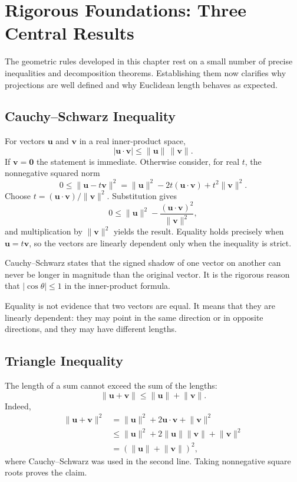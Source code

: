 \section{Rigorous Foundations: Three Central Results}
\label{sec:rigorous-vector-foundations}

The geometric rules developed in this chapter rest on a small number of precise
inequalities and decomposition theorems. Establishing them now clarifies why
projections are well defined and why Euclidean length behaves as expected.

\subsection{Cauchy--Schwarz Inequality}
For vectors $\mathbf u$ and $\mathbf v$ in a real inner-product space,
\[
\boxed{|\mathbf u\cdot\mathbf v|\leq \lVert\mathbf u\rVert\,\lVert\mathbf v\rVert.}
\]
If $\mathbf v=\mathbf0$ the statement is immediate. Otherwise consider, for
real $t$, the nonnegative squared norm
\[
0\leq\lVert\mathbf u-t\mathbf v\rVert^2
=\lVert\mathbf u\rVert^2-2t(\mathbf u\cdot\mathbf v)
+t^2\lVert\mathbf v\rVert^2.
\]
Choose $t=(\mathbf u\cdot\mathbf v)/\lVert\mathbf v\rVert^2$. Substitution gives
\[
0\leq \lVert\mathbf u\rVert^2-
\frac{(\mathbf u\cdot\mathbf v)^2}{\lVert\mathbf v\rVert^2},
\]
and multiplication by $\lVert\mathbf v\rVert^2$ yields the result. Equality
holds precisely when $\mathbf u=t\mathbf v$, so the vectors are linearly
dependent only when the inequality is strict.

\begin{physicalbox}
Cauchy--Schwarz states that the signed shadow of one vector on another can
never be longer in magnitude than the original vector. It is the rigorous
reason that $|\cos\theta|\leq1$ in the inner-product formula.
\end{physicalbox}

\begin{mistakebox}
Equality is not evidence that two vectors are equal. It means that they are
linearly dependent: they may point in the same direction or in opposite
directions, and they may have different lengths.
\end{mistakebox}

\subsection{Triangle Inequality}
The length of a sum cannot exceed the sum of the lengths:
\[
\boxed{\lVert\mathbf u+\mathbf v\rVert\leq
\lVert\mathbf u\rVert+\lVert\mathbf v\rVert.}
\]
Indeed,
\begin{align*}
\lVert\mathbf u+\mathbf v\rVert^2
&=\lVert\mathbf u\rVert^2+2\mathbf u\cdot\mathbf v+\lVert\mathbf v\rVert^2\\
&\leq\lVert\mathbf u\rVert^2+2\lVert\mathbf u\rVert\lVert\mathbf v\rVert+\lVert\mathbf v\rVert^2\\
&=(\lVert\mathbf u\rVert+\lVert\mathbf v\rVert)^2,
\end{align*}
where Cauchy--Schwarz was used in the second line. Taking nonnegative square
roots proves the claim.

